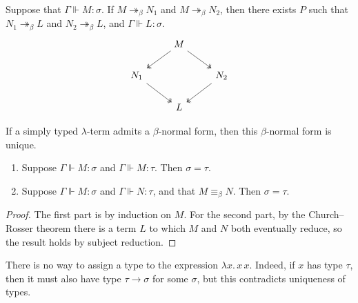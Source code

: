 \begin{theorem}
    Suppose that \( \Gamma \Vdash M : \sigma \).
    If \( M \twoheadrightarrow_\beta N_1 \) and \( M \twoheadrightarrow_\beta N_2 \), then there exists \( P \) such that \( N_1 \twoheadrightarrow_\beta L \) and \( N_2 \twoheadrightarrow_\beta L \), and \( \Gamma \Vdash L : \sigma \).
\[\begin{tikzcd}
	& M \\
	{N_1} && {N_2} \\
	& L
	\arrow[two heads, from=1-2, to=2-1]
	\arrow[two heads, from=2-1, to=3-2]
	\arrow[two heads, from=1-2, to=2-3]
	\arrow[two heads, from=2-3, to=3-2]
\end{tikzcd}\]
\end{theorem}
\begin{corollary}
    If a simply typed \( \lambda \)-term admits a \( \beta \)-normal form, then this \( \beta \)-normal form is unique.
\end{corollary}
\begin{proposition}
    \begin{enumerate}
        \item Suppose \( \Gamma \Vdash M : \sigma \) and \( \Gamma \Vdash M : \tau \).
        Then \( \sigma = \tau \).
        \item Suppose \( \Gamma \Vdash M : \sigma \) and \( \Gamma \Vdash N : \tau \), and that \( M \equiv_\beta N \).
        Then \( \sigma = \tau \).
    \end{enumerate}
\end{proposition}
\begin{proof}
    The first part is by induction on \( M \).
    For the second part, by the Church--Rosser theorem there is a term \( L \) to which \( M \) and \( N \) both eventually reduce, so the result holds by subject reduction.
\end{proof}
\begin{example}
    There is no way to assign a type to the expression \( \lambda x.\, x\, x \).
    Indeed, if \( x \) has type \( \tau \), then it must also have type \( \tau \to \sigma \) for some \( \sigma \), but this contradicts uniqueness of types.
\end{example}

